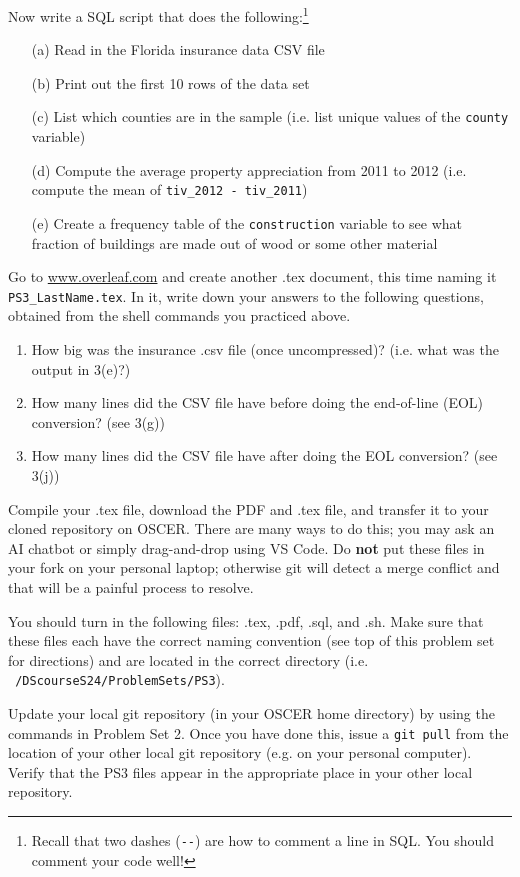 \documentclass[12pt,english]{exam}
\begin{document}
\begin{questions}
\question Now write a SQL script that does the following:\footnote{Recall that two dashes (\texttt{-{}-}) are how to comment a line in SQL. You should comment your code well!}
\begin{itemize}
	\item[(a)] Read in the Florida insurance data CSV file
	\item[(b)] Print out the first 10 rows of the data set
	\item[(c)] List which counties are in the sample (i.e. list unique values of the \texttt{county} variable)
	\item[(d)] Compute the average property appreciation from 2011 to 2012 (i.e. compute the mean of \texttt{tiv\_2012 - tiv\_2011})
	\item[(e)] Create a frequency table of the \texttt{construction} variable to see what fraction of buildings are made out of wood or some other material
\end{itemize}

\question Go to \url{www.overleaf.com} and create another .tex document, this time naming it \texttt{PS3\_LastName.tex}. In it, write down your answers to the following questions, obtained from the shell commands you practiced above.
\begin{enumerate}
	\item How big was the insurance .csv file (once uncompressed)? (i.e. what was the output in 3(e)?)
	\item How many lines did the CSV file have before doing the end-of-line (EOL) conversion? (see 3(g))
	\item How many lines did the CSV file have after doing the EOL conversion? (see 3(j))
\end{enumerate}

\question Compile your .tex file, download the PDF and .tex file, and transfer it to your cloned repository on OSCER. There are many ways to do this;  you may ask an AI chatbot or simply drag-and-drop using VS Code. Do \textbf{not} put these files in your fork on your personal laptop; otherwise git will detect a merge conflict and that will be a painful process to resolve.

\question You should turn in the following files: .tex, .pdf, .sql, and .sh. Make sure that these files each have the correct naming convention (see top of this problem set for directions) and are located in the correct directory (i.e. \texttt{~/DScourseS24/ProblemSets/PS3}).

\question Update your local git repository (in your OSCER home directory) by using the commands in Problem Set 2. Once you have done this, issue a \texttt{git pull} from the location of your other local git repository (e.g. on your personal computer). Verify that the PS3 files appear in the appropriate place in your other local repository.


\end{questions}
\end{document}
